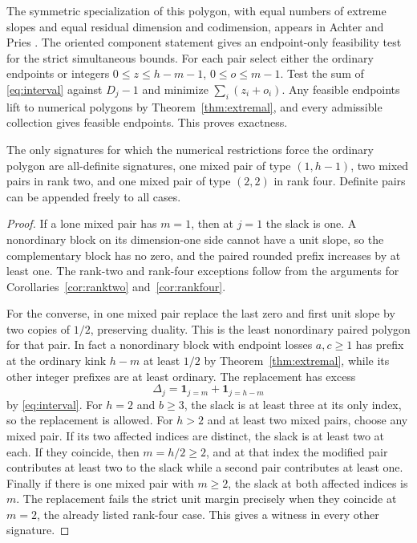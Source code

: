 The symmetric specialization of this polygon, with equal numbers
of extreme slopes and equal residual dimension and codimension,
appears in Achter and Pries \cite[Definition~2.4]{achterpries}.
The oriented component statement gives an endpoint-only feasibility
test for the strict simultaneous bounds. For each pair select
either the ordinary endpoints or integers
\(0\le z\le h-m-1\), \(0\le o\le m-1\).
Test the sum of \eqref{eq:interval} against \(D_j-1\) and minimize
\(\sum_i(z_i+o_i)\). Any feasible endpoints lift to numerical
polygons by Theorem~\ref{thm:extremal}, and every admissible
collection gives feasible endpoints. This proves exactness.

\begin{proposition}\label{prop:signatures}
The only signatures for which the numerical restrictions force the
ordinary polygon are all-definite signatures, one mixed pair of type
\((1,h-1)\), two mixed pairs in rank two, and one mixed pair of
type \((2,2)\) in rank four. Definite pairs can be appended freely
to all cases.
\end{proposition}

\begin{proof}
If a lone mixed pair has \(m=1\), then at \(j=1\) the slack
is one. A nonordinary block on its dimension-one side cannot
have a unit slope, so the complementary block has no zero, and
the paired rounded prefix increases by at least one.
The rank-two and rank-four exceptions follow from the arguments
for Corollaries~\ref{cor:ranktwo} and~\ref{cor:rankfour}.

For the converse, in one mixed pair replace the last zero and
first unit slope by two copies of \(1/2\), preserving duality.
This is the least nonordinary paired polygon for that pair.
In fact a nonordinary block with endpoint losses \(a,c\ge1\) has
prefix at the ordinary kink \(h-m\) at least \(1/2\) by
Theorem~\ref{thm:extremal}, while its other integer prefixes
are at least ordinary. The replacement has excess
\[
        \Delta_j=\mathbf 1_{j=m}+\mathbf 1_{j=h-m}
\]
by \eqref{eq:interval}. For \(h=2\) and \(b\ge3\), the slack is
at least three at its only index, so the replacement is allowed.
For \(h>2\) and at least two mixed pairs, choose any mixed pair.
If its two affected indices are distinct, the slack is at least
two at each. If they coincide, then \(m=h/2\ge2\), and at that
index the modified pair contributes at least two to the slack
while a second pair contributes at least one. Finally if there is
one mixed pair with \(m\ge2\), the slack at both affected indices
is \(m\). The replacement fails the strict unit margin precisely
when they coincide at \(m=2\), the already listed rank-four case.
This gives a witness in every other signature.
\end{proof}

